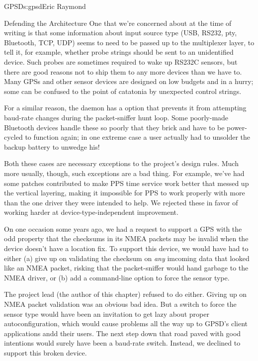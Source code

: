 \begin{aosachapter}{GPSD}{s:gpsd}{Eric Raymond}
\begin{aosasect1}{Defending the Architecture}
One that we're concerned about at the time of writing is that some
information about input source type (USB, RS232, pty, Bluetooth, TCP,
UDP) seems to need to be passed up to the multiplexer layer, to tell it,
for example, whether probe strings should be sent to an unidentified
device. Such probes are sometimes required to wake up RS232C sensors, but
there are good reasons not to ship them to any more devices than we
have to. Many GPSs and other sensor devices are designed on low
budgets and in a hurry; some can be confused to the point of catatonia
by unexpected control strings.

For a similar reason, the daemon has a  option that prevents 
it from attempting baud-rate changes  during the packet-sniffer
hunt loop.  Some poorly-made Bluetooth devices handle these so poorly
that they brick and have to be power-cycled to function again; in one
extreme case a user actually had to unsolder the backup battery to
unwedge his!

Both these cases are necessary exceptions to the project's design
rules.  Much more usually, though, such exceptions are a bad thing.
For example, we've had some patches contributed to make PPS time
service work better that messed up the vertical layering, making it
impossible for PPS to work properly with more than the one driver they
were intended to help. We rejected these in favor of working harder
at device-type-independent improvement.

On one occasion some years ago, we had a request to support a GPS with
the odd property that the checksums in its NMEA packets may be invalid
when the device doesn't have a location fix.  To support this device,
we would have had to either (a) give up on validating the checksum on
\emph{any} imcoming data that looked like an NMEA packet, risking that
the packet-sniffer would hand garbage to the NMEA driver, or (b) add a
command-line option to force the sensor type.

The project lead (the author of this chapter) refused to do either.
Giving up on NMEA packet validation was an obvious bad idea.  But a
switch to force the sensor type would have been an invitation to get
lazy about proper autoconfiguration, which would cause problems all
the way up to GPSD's client applications andd their users.  The next
step down that road paved with good intentions would surely have been
a baud-rate switch. Instead, we declined to support this broken device.


\end{aosasect1}
\end{aosachapter}
